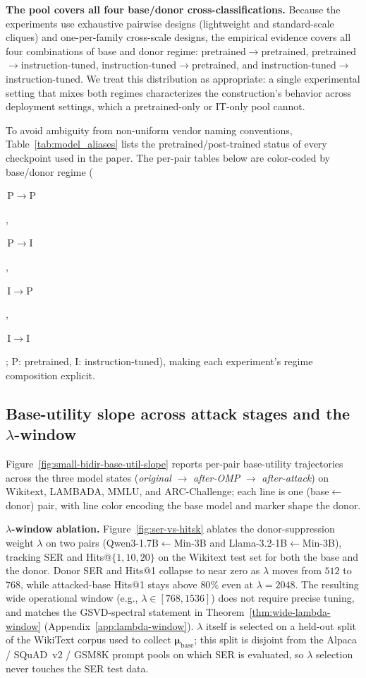 \noindent\textbf{The pool covers all four base/donor cross-classifications.}
Because the experiments use exhaustive pairwise designs (lightweight and standard-scale cliques) and one-per-family cross-scale designs, the empirical evidence covers all four combinations of base and donor regime: pretrained$\to$pretrained, pretrained$\to$instruction-tuned, instruction-tuned$\to$pretrained, and instruction-tuned$\to$instruction-tuned. We treat this distribution as appropriate: a single experimental setting that mixes both regimes characterizes the construction's behavior across deployment settings, which a pretrained-only or IT-only pool cannot.

To avoid ambiguity from non-uniform vendor naming conventions, Table~\ref{tab:model_aliases} lists the pretrained/post-trained status of every checkpoint used in the paper. The per-pair tables below are color-coded by base/donor regime (\colorbox{rowPP}{\strut\,P$\to$P\,}, \colorbox{rowPI}{\strut\,P$\to$I\,}, \colorbox{rowIP}{\strut\,I$\to$P\,}, \colorbox{rowII}{\strut\,I$\to$I\,}; P: pretrained, I: instruction-tuned), making each experiment's regime composition explicit.

\subsection{Base-utility slope across attack stages and the $\lambda$-window}
\label{app:base_util_slope}
\label{app:lambda_window}

Figure~\ref{fig:small-bidir-base-util-slope} reports per-pair base-utility trajectories across the three model states (\emph{original} $\to$ \emph{after-OMP} $\to$ \emph{after-attack}) on Wikitext, LAMBADA, MMLU, and ARC-Challenge; each line is one (base$\leftarrow$donor) pair, with line color encoding the base model and marker shape the donor.

\noindent\textbf{$\lambda$-window ablation.} Figure~\ref{fig:ser-vs-hitsk} ablates the donor-suppression weight $\lambda$ on two pairs (Qwen3-1.7B$\leftarrow$Min-3B and Llama-3.2-1B$\leftarrow$Min-3B), tracking SER and Hits@$\{1,10,20\}$ on the Wikitext test set for both the base and the donor. Donor SER and Hits@1 collapse to near zero as $\lambda$ moves from $512$ to $768$, while attacked-base Hits@1 stays above $80\%$ even at $\lambda{=}2048$. The resulting wide operational window (e.g., $\lambda\in[768, 1536]$) does not require precise tuning, and matches the GSVD-spectral statement in Theorem~\ref{thm:wide-lambda-window} (Appendix~\ref{app:lambda-window}). $\lambda$ itself is selected on a held-out split of the WikiText corpus used to collect $\boldsymbol{\mu}_{\text{base}}$; this split is disjoint from the Alpaca / SQuAD~v2 / GSM8K prompt pools on which SER is evaluated, so $\lambda$ selection never touches the SER test data.

